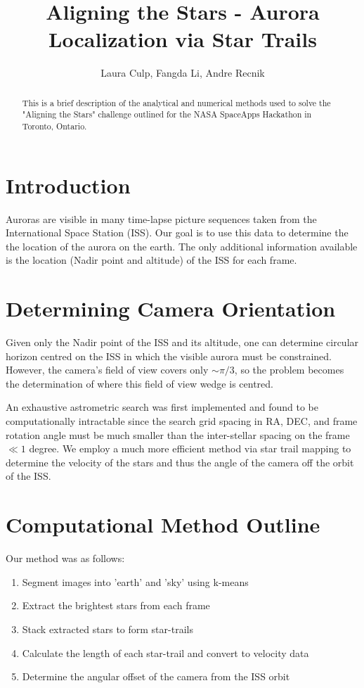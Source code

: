 \documentclass[onecolumn,preprintnumbers,amsmath,amssymb]{revtex4}
\begin{document}
 
\title{Aligning the Stars - Aurora Localization via Star Trails}
\author{ Laura Culp, Fangda Li, Andre Recnik}

\begin{abstract}
This is a brief description of the analytical and numerical methods used to solve the "Aligning the Stars" challenge outlined for the NASA SpaceApps Hackathon in Toronto, Ontario.
\end{abstract}

\maketitle

\section{\bf Introduction }

Auroras are visible in many time-lapse picture sequences taken from the International Space Station (ISS).  Our goal is to use this data to determine the the location of the aurora on the earth.  The only additional information available is the location (Nadir point and altitude) of the ISS for each frame.

\section{ \bf Determining Camera Orientation }

Given only the Nadir point of the ISS and its altitude, one can determine circular horizon centred on the ISS in which the visible aurora must be constrained.  However, the camera's field of view covers only $\sim \pi/3$, so the problem becomes the determination of where this field of view wedge is centred.

An exhaustive astrometric search was first implemented and found to be computationally intractable since the search grid spacing in RA, DEC, and frame rotation angle must be much smaller than the inter-stellar spacing on the frame $\ll 1$ degree.  We employ a much more efficient method via star trail mapping to determine the velocity of the stars and thus the angle of the camera off the orbit of the ISS.

\section{\bf Computational Method Outline }

Our method was as follows:
\begin{enumerate}
\item Segment images into 'earth' and 'sky' using k-means
\item Extract the brightest stars from each frame
\item Stack extracted stars to form star-trails
\item Calculate the length of each star-trail and convert to velocity data
\item Determine the angular offset of the camera from the ISS orbit
\end{enumerate}
\end{document}
